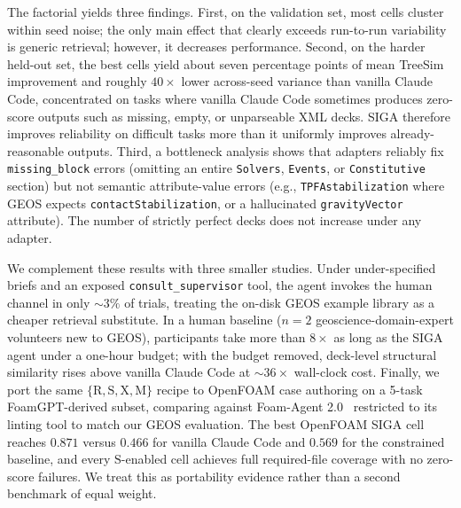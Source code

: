 \documentclass{article}
\begin{document}
The factorial yields three findings. First, on the validation set, most cells cluster within seed noise; the only main effect that clearly exceeds run-to-run variability is generic retrieval; however, it decreases performance. Second, on the harder held-out set, the best cells yield about seven percentage points of mean TreeSim improvement and roughly $40\times$ lower across-seed variance than vanilla Claude Code, concentrated on tasks where vanilla Claude Code sometimes produces zero-score outputs such as missing, empty, or unparseable XML decks. SIGA therefore improves reliability on difficult tasks more than it uniformly improves already-reasonable outputs. Third, a bottleneck analysis shows that adapters reliably fix \texttt{missing\_block} errors (omitting an entire \texttt{Solvers}, \texttt{Events}, or \texttt{Constitutive} section) but not semantic attribute-value errors (e.g., \texttt{TPFAstabilization} where GEOS expects \texttt{contactStabilization}, or a hallucinated \texttt{gravityVector} attribute). The number of strictly perfect decks does not increase under any adapter.

We complement these results with three smaller studies. Under under-specified briefs and an exposed \texttt{consult\_supervisor} tool, the agent invokes the human channel in only ${\sim}3\%$ of trials, treating the on-disk GEOS example library as a cheaper retrieval substitute. In a human baseline ($n{=}2$ geoscience-domain-expert volunteers new to GEOS), participants take more than $8\times$ as long as the SIGA agent under a one-hour budget; with the budget removed, deck-level structural similarity rises above vanilla Claude Code at $\sim\!36\times$ wall-clock cost. Finally, we port the same $\{\mathrm{R,S,X,M}\}$ recipe to OpenFOAM case authoring on a 5-task FoamGPT-derived subset, comparing against Foam-Agent 2.0~\citep{foamagent2025} restricted to its linting tool to match our GEOS evaluation. The best OpenFOAM SIGA cell reaches $0.871$ versus $0.466$ for vanilla Claude Code and $0.569$ for the constrained baseline, and every $\mathrm{S}$-enabled cell achieves full required-file coverage with no zero-score failures. We treat this as portability evidence rather than a second benchmark of equal weight.
\end{document}
